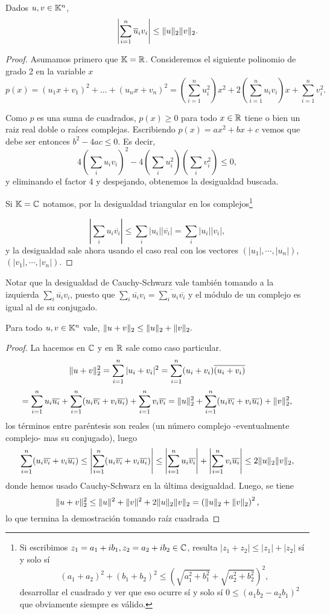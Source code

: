 \begin{prop}
\label{prop:CS}
Dados $\ub, \vb \in \K^n$,
$$
\left|\sum_{i=1}^{n} \overline u_{i}v_{i}\right|\leq \|\ub\|_2\|\vb\|_2.
$$
\end{prop}
\begin{proof}
Asumamos primero que $\mathbb K=\mathbb R$. Consideremos el siguiente polinomio de grado 2 en la variable $x$
$$
p(x) = (u_1 x + v_1)^2 + \dots + (u_n x +v_n)^2  =\left(\sum _{i=1}^nu_{i}^{2}\right)x^{2}+2\left(\sum _{i=1}^nu_{i}v_{i}\right)x+\sum _{i=1}^nv_{i}^{2}.
$$

Como $p$ es una suma de cuadrados, $p(x) \ge 0$ para todo $x \in \mathbb R$  tiene o bien un raiz real doble o raíces complejas. Escribiendo $p(x)=ax^2 + bx + c$ vemos que debe ser entonces $b^2-4ac \le 0$. Es decir,
$$
4 \left(\sum _{i}u_{i}v_{i}\right)^{2}- 4 \left(\sum _{i}{u_{i}^{2}}\right)\left(\sum _{i}{v_{i}^{2}}\right)\leq 0,
$$
y eliminando el factor 4 y despejando, obtenemos la desigualdad buscada.

Si $\mathbb K=\mathbb C$ notamos, por la desigualdad triangular en los complejos\footnote{Si escribimos $z_1=a_1+ib_1,z_2=a_2+ib_2\in \mathbb C$, resulta
$|z_1+z_2|\le|z_1|+|z_2|$ sí y solo sí
$$(a_1+a_2)^2+(b_1+b_2)^2\le \left(\sqrt{a_1^2+b_1^2}+\sqrt{a_2^2+b_2^2}\right)^2,$$ desarrollar el cuadrado y ver que eso ocurre sí y solo sí $0\le(a_1b_2-a_2b_1)^2$ que obviamente siempre es válido.}


$$
\left|\sum _{i}u_{i}\overline{v_{i}}\right|\le \sum _{i}|u_{i}||\overline{v_{i}}|=\sum _{i}|u_{i}||{v_{i}}|,
$$
y la desigualdad sale ahora usando el caso real con los vectores $(|u_1|,\cdots,|u_n|)$,$(|v_1|,\cdots,|v_n|)$.
\end{proof}
\begin{rem}
Notar que la desigualdad de Cauchy-Schwarz vale también tomando a la izquierda
$\sum _{i}\overline{u_{i}}{v_{i}}$, puesto que $\sum _{i}\overline{u_{i}}{v_{i}}=\overline{\sum _{i}u_{i}\overline{v_{i}}}$ y el módulo de un complejo es igual al de su conjugado.
\end{rem}
\begin{cor}
 Para todo $\ub,\vb\in \K^n$ vale,
 $\|\ub+\vb\|_2\le\|\ub\|_2+\|\vb\|_2.$
\end{cor}
\begin{proof}
La hacemos en $\mathbb C$ y en $\mathbb R$  sale como caso particular.
$$
\|\ub+\vb\|_2^2=
\sum_{i=1}^n |u_i+v_i|^2=\sum_{i=1}^n (u_i+v_i)\overline{(u_i+v_i)}
$$
$$
=\sum_{i=1}^n u_i\overline{u_i}+
\sum_{i=1}^n(u_i\overline{v_i}+v_i\overline{u_i})+\sum_{i=1}^n v_i\overline{v_i}=\|\ub\|_2^2+\sum_{i=1}^n(u_i\overline{v_i}+v_i\overline{u_i})+\|\vb\|^2_2,
$$
los términos entre paréntesis son reales (un número complejo -eventualmente complejo- mas su conjugado), luego
$$
\sum_{i=1}^n(u_i\overline{v_i}+v_i\overline{u_i})\le
\left|\sum_{i=1}^n(u_i\overline{v_i}+v_i\overline{u_i})\right|\le\left|\sum_{i=1}^nu_i\overline{v_i}\right|+\left|\sum_{i=1}^nv_i\overline{u_i}\right| \le 2\|\ub\|_2\|\vb\|_2,
$$
donde hemos usado Cauchy-Schwarz en la última desigualdad.
Luego, se tiene
$$
\|\ub+\vb\|_2^2\le \|\ub\|^2+\|\vb\|^2+2\|\ub\|_2\|\vb\|_2=
\left(\|\ub\|_2+\|\vb\|_2\right)^2,
$$
lo que termina la demostración tomando raíz cuadrada \end{proof}
